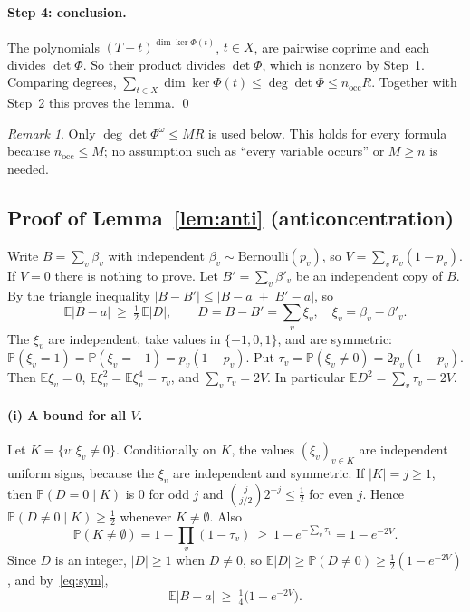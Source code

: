 \documentclass[11pt,a4paper]{article}
\theoremstyle{definition}
\theoremstyle{remark}
\newtheorem{remark}[theorem]{Remark}
\newcommand{\E}{\mathbb{E}}
\newcommand{\PP}{\mathbb{P}}
\newcommand{\nocc}{n_{\mathrm{occ}}}
\begin{document}
\paragraph{Step 4: conclusion.} The polynomials $(T-t)^{\dim\ker\Phi(t)}$, $t\in X$, are
pairwise coprime and each divides $\det\Phi$. So their product divides $\det\Phi$, which is
nonzero by Step~1. Comparing degrees,
$\sum_{t\in X}\dim\ker\Phi(t)\le\deg\det\Phi\le\nocc R$. Together with Step~2 this proves the
lemma. \qed

\begin{remark}\label{rem:mn}
Only $\deg\det\Phi^\omega\le MR$ is used below. This holds for every formula because
$\nocc\le M$; no assumption such as ``every variable occurs'' or $M\ge n$ is needed.
\end{remark}

\subsection{Proof of Lemma~\ref{lem:anti} (anticoncentration)}

Write $B=\sum_{v}\beta_v$ with independent $\beta_v\sim\mathrm{Bernoulli}(p_v)$, so
$V=\sum_vp_v(1-p_v)$. If $V=0$ there is nothing to prove. Let $B'=\sum_v\beta'_v$ be an
independent copy of $B$. By the triangle inequality $|B-B'|\le|B-a|+|B'-a|$, so
\begin{equation}\label{eq:sym}
\E|B-a|\ \ge\ \tfrac12\,\E|D|,\qquad D=B-B'=\sum_v\xi_v,\quad \xi_v=\beta_v-\beta'_v .
\end{equation}
The $\xi_v$ are independent, take values in $\{-1,0,1\}$, and are symmetric:
$\PP(\xi_v=1)=\PP(\xi_v=-1)=p_v(1-p_v)$. Put $\tau_v=\PP(\xi_v\ne0)=2p_v(1-p_v)$. Then
$\E\xi_v=0$, $\E\xi_v^2=\E\xi_v^4=\tau_v$, and $\sum_v\tau_v=2V$. In particular
$\E D^2=\sum_v\tau_v=2V$.

\paragraph{(i) A bound for all $V$.} Let $K=\{v:\xi_v\ne0\}$. Conditionally on $K$, the
values $(\xi_v)_{v\in K}$ are independent uniform signs, because the $\xi_v$ are independent
and symmetric. If $|K|=j\ge1$, then $\PP(D=0\mid K)$ is $0$ for odd $j$ and
$\binom{j}{j/2}2^{-j}\le\frac12$ for even $j$. Hence $\PP(D\ne0\mid K)\ge\frac12$ whenever
$K\ne\emptyset$. Also
\[
\PP(K\ne\emptyset)=1-\prod_v(1-\tau_v)\ \ge\ 1-e^{-\sum_v\tau_v}=1-e^{-2V}.
\]
Since $D$ is an integer, $|D|\ge1$ when $D\ne0$, so
$\E|D|\ge\PP(D\ne0)\ge\frac12(1-e^{-2V})$, and by~\eqref{eq:sym},
\begin{equation}\label{eq:smallV}
\E|B-a|\ \ge\ \tfrac14\bigl(1-e^{-2V}\bigr).
\end{equation}
\end{document}
